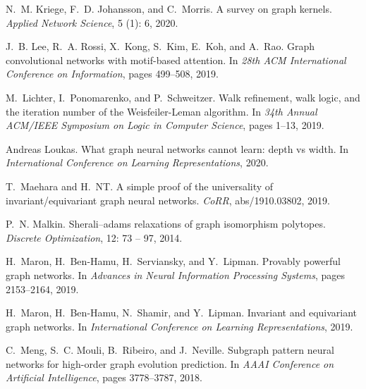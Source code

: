 \documentclass{article}
\theoremstyle{definition}
\begin{document}
\begin{thebibliography}{125}
	N.~M. Kriege, F.~D. Johansson, and C.~Morris.
	\newblock A survey on graph kernels.
	\newblock \emph{Applied Network Science}, 5 (1): 6, 2020.
	
	J.~B. Lee, R.~A. Rossi, X.~Kong, S.~Kim, E.~Koh, and A.~Rao.
	\newblock Graph convolutional networks with motif-based attention.
	\newblock In \emph{28th {ACM} International Conference on Information}, pages
	499--508, 2019.
	
	M.~Lichter, I.~Ponomarenko, and P.~Schweitzer.
	\newblock Walk refinement, walk logic, and the iteration number of the
	{Weisfeiler-Leman} algorithm.
	\newblock In \emph{34th Annual {ACM/IEEE} Symposium on Logic in Computer
		Science}, pages 1--13, 2019.
	
	Andreas Loukas.
	\newblock What graph neural networks cannot learn: depth vs width.
	\newblock In \emph{International Conference on Learning Representations}, 2020.
	
	T.~Maehara and H.~NT.
	\newblock A simple proof of the universality of invariant/equivariant graph
	neural networks.
	\newblock \emph{CoRR}, abs/1910.03802, 2019.
	
	P.~N. Malkin.
	\newblock Sherali–adams relaxations of graph isomorphism polytopes.
	\newblock \emph{Discrete Optimization}, 12: 73 -- 97, 2014.
	
	H.~Maron, H.~Ben{-}Hamu, H.~Serviansky, and Y.~Lipman.
	\newblock Provably powerful graph networks.
	\newblock In \emph{Advances in Neural Information Processing Systems}, pages
	2153--2164, 2019{}.
	
	H.~Maron, H.~Ben{-}Hamu, N.~Shamir, and Y.~Lipman.
	\newblock Invariant and equivariant graph networks.
	\newblock In \emph{International Conference on Learning Representations},
	2019{}.
	
	C.~Meng, S.~C. Mouli, B.~Ribeiro, and J.~Neville.
	\newblock Subgraph pattern neural networks for high-order graph evolution
	prediction.
	\newblock In \emph{{AAAI} Conference on Artificial Intelligence}, pages
	3778--3787, 2018.
	

\end{thebibliography}
\end{document}
